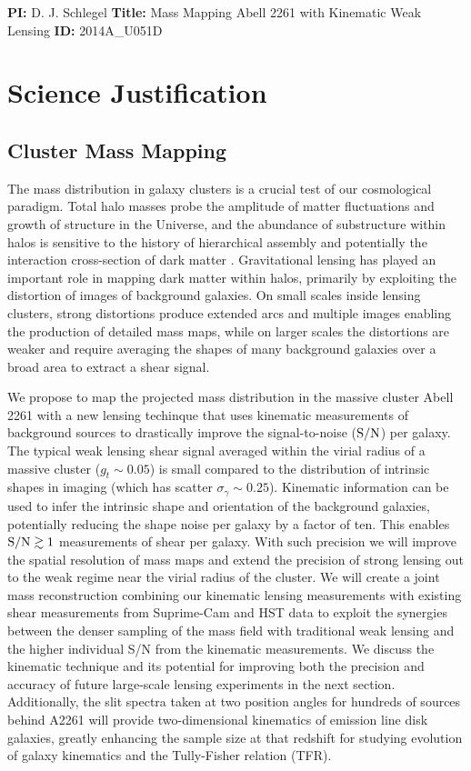 \documentclass[12pt]{article}
\begin{document}
\textbf{PI:} D. J. Schlegel \textbf{Title:} Mass Mapping Abell 2261 with Kinematic Weak Lensing \textbf{ID:} 2014A\_U051D

\section{Science Justification}


\subsection{Cluster Mass Mapping}

The mass distribution in galaxy clusters is a crucial test of our cosmological paradigm. Total halo masses probe the amplitude of matter fluctuations and growth of structure in the Universe, and the abundance of substructure within halos is sensitive to the history of hierarchical assembly and potentially the interaction cross-section of dark matter \citep[e.g.,][]{Natarajan2002a, Natarajan2002b, Voit2005, Clowe2006}. Gravitational lensing has played an important role in mapping dark matter within halos, primarily by exploiting the distortion of images of background galaxies. On small scales inside lensing clusters, strong distortions produce extended arcs and multiple images enabling the production of detailed mass maps, while on larger scales the distortions are weaker and require averaging the shapes of many background galaxies over a broad area to extract a shear signal.

We propose to map the projected mass distribution in the massive cluster Abell 2261 with a new lensing techinque that uses kinematic measurements of background sources to drastically improve the signal-to-noise (${\rm S/N}$) per galaxy. The typical weak lensing shear signal averaged within the virial radius of a massive cluster ($g_t\sim0.05$) is small compared to the distribution of intrinsic shapes in imaging (which has scatter $\sigma_\gamma\sim0.25$). Kinematic information can be used to infer the intrinsic shape and orientation of the background galaxies, potentially reducing the shape noise per galaxy by a factor of ten. This enables ${\rm S/N}\gtrsim1$ measurements of shear per galaxy. With such precision we will improve the spatial resolution of mass maps and extend the precision of strong lensing out to the weak regime near the virial radius of the cluster.  We will create a joint mass reconstruction combining our kinematic lensing measurements with existing shear measurements from Suprime-Cam and HST data to exploit the synergies between the denser sampling of the mass field with traditional weak lensing and the higher individual S/N from the kinematic measurements. We discuss the kinematic technique and its potential for improving both the precision and accuracy of future large-scale lensing experiments in the next section. Additionally, the slit spectra taken at two position angles for hundreds of sources behind A2261 will provide two-dimensional kinematics of emission line disk galaxies, greatly enhancing the sample size at that redshift for studying evolution of galaxy kinematics and the Tully-Fisher relation (TFR).
\end{document}
